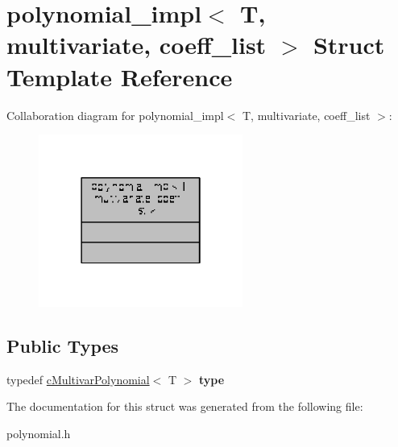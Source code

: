 \hypertarget{structpolynomial__impl_3_01T_00_01multivariate_00_01coeff__list_01_4}{\section{polynomial\-\_\-impl$<$ T, multivariate, coeff\-\_\-list $>$ Struct Template Reference}
\label{structpolynomial__impl_3_01T_00_01multivariate_00_01coeff__list_01_4}
}


Collaboration diagram for polynomial\-\_\-impl$<$ T, multivariate, coeff\-\_\-list $>$\-:
\nopagebreak
\begin{figure}[H]
\begin{center}
\leavevmode
\includegraphics[width=190pt]{structpolynomial__impl_3_01T_00_01multivariate_00_01coeff__list_01_4__coll__graph}
\end{center}
\end{figure}
\subsection*{Public Types}
\begin{DoxyCompactItemize}
\item 
\hypertarget{structpolynomial__impl_3_01T_00_01multivariate_00_01coeff__list_01_4_af9bca51d74e05c8c66b075004484a4d5}{typedef \hyperlink{classcMultivarPolynomial}{c\-Multivar\-Polynomial}$<$ T $>$ {\bfseries type}}\label{structpolynomial__impl_3_01T_00_01multivariate_00_01coeff__list_01_4_af9bca51d74e05c8c66b075004484a4d5}

\end{DoxyCompactItemize}


The documentation for this struct was generated from the following file\-:\begin{DoxyCompactItemize}
\item 
polynomial.\-h\end{DoxyCompactItemize}
